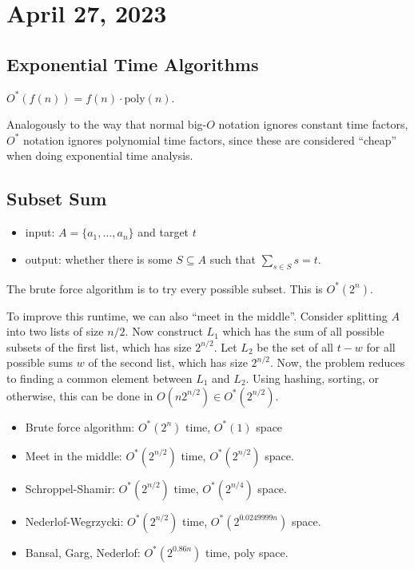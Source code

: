 \section{April 27, 2023}

\subsection{Exponential Time Algorithms}

\begin{definition}

$O^*(f(n)) = f(n)\cdot \text{poly}(n)$. 
\end{definition}

Analogously to the way that normal big-$O$ notation ignores constant time factors, $O^*$ notation ignores polynomial time factors, since these are considered ``cheap'' when doing exponential time analysis. 

\subsection{Subset Sum}

\begin{itemize}
    \item input: $A = \{a_1, \hdots, a_n\}$ and target $t$
    \item output: whether there is some $S\subseteq A$ such that $\sum_{s\in S}s=t$.
\end{itemize}

The brute force algorithm is to try every possible subset. This is $O^*(2^n)$. 

To improve this runtime, we can also ``meet in the middle''. Consider splitting $A$ into two lists of size $n/2$. Now construct $L_1$ which has the sum of all possible subsets of the first list, which has size $2^{n/2}$. Let $L_2$ be the set of all $t-w$ for all possible sums $w$ of the second list, which has size $2^{n/2}$. Now, the problem reduces to finding a common element between $L_1$ and $L_2$. Using hashing, sorting, or otherwise, this can be done in $O(n2^{n/2})\in O^*(2^{n/2})$.  
\begin{itemize}
    \item Brute force algorithm: $O^*(2^n)$ time, $O^*(1)$ space
    \item Meet in the middle: $O^*(2^{n/2})$ time, $O^*(2^{n/2})$ space. 
    \item Schroppel-Shamir: $O^*(2^{n/2})$ time, $O^*(2^{n/4})$ space.
    \item Nederlof-Wegrzycki: $O^*(2^{n/2})$ time, $O^*(2^{0.0249999n})$ space. 
    \item Bansal, Garg, Nederlof: $O^*(2^{0.86n})$ time, poly space.
\end{itemize}

